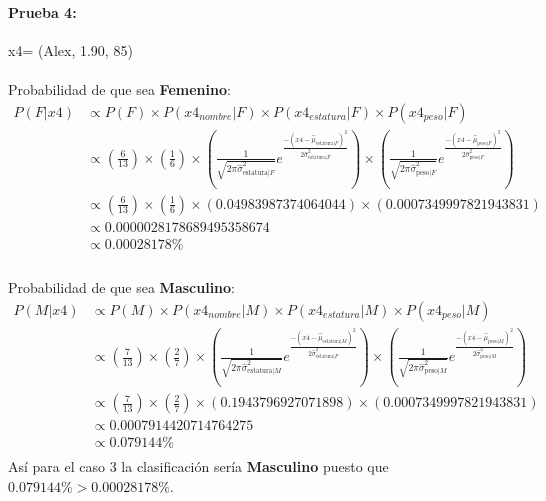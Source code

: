 \documentclass[12pt]{article}
\begin{document}
 \paragraph{Prueba 4: }x4= (Alex, 1.90, 85)
 \paragraph{}Probabilidad de que sea \textbf{Femenino}:\\
 \begin{equation}
 \begin{split}
 P(F|x4) &\propto P(F) \times P(x4_{nombre}|F) \times P(x4_{estatura}|F) \times P(x4_{peso}|F) \\
 &\propto (\frac{6}{13}) \times (\frac{1}{6}) \times (\frac{1}{\sqrt{2\pi\hat{\sigma}_{\text{estatura}|F}^2}}e^{\frac{-(x4 - \hat{\mu}_{\text{estatura}|F})^2}{2\hat{\sigma}_{\text{estatura}|F}^2}}) \times (\frac{1}{\sqrt{2\pi\hat{\sigma}_{\text{peso}|F}^2}}e^{\frac{-(x4 - \hat{\mu}_{\text{peso}|F})^2}{2\hat{\sigma}_{\text{peso}|F}^2}}) \\
 &\propto (\frac{6}{13}) \times (\frac{1}{6}) \times (0.04983987374064044) \times (0.0007349997821943831) \\
 &\propto 0.0000028178689495358674 \\
 &\propto 0.00028178\% \\
 \end{split}
 \end{equation}
 \paragraph{}Probabilidad de que sea \textbf{Masculino}:\\
 \begin{equation}
 \begin{split}
 P(M|x4) &\propto P(M) \times P(x4_{nombre}|M) \times P(x4_{estatura}|M) \times P(x4_{peso}|M) \\
 &\propto (\frac{7}{13}) \times (\frac{2}{7}) \times (\frac{1}{\sqrt{2\pi\hat{\sigma}_{\text{estatura}|M}^2}}e^{\frac{-(x4 - \hat{\mu}_{\text{estatura}|M})^2}{2\hat{\sigma}_{\text{estatura}|F}^2}}) \times (\frac{1}{\sqrt{2\pi\hat{\sigma}_{\text{peso}|M}^2}}e^{\frac{-(x4 - \hat{\mu}_{\text{peso}|M})^2}{2\hat{\sigma}_{\text{peso}|M}^2}}) \\
 &\propto (\frac{7}{13}) \times (\frac{2}{7}) \times (0.1943796927071898) \times (0.0007349997821943831) \\
 &\propto 0.0007914420714764275 \\
 &\propto 0.079144 \% \\
 \end{split}
 \end{equation}
 Así para el caso 3 la clasificación sería \textbf{Masculino} puesto que $0.079144\% > 0.00028178\%$.\\
\end{document}
